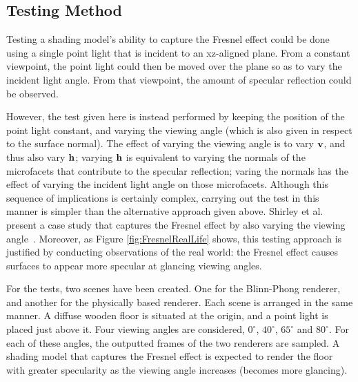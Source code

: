 \subsection{Testing Method}

Testing a shading model's ability to capture the Fresnel effect could be done using a single point light that is incident to an xz-aligned plane. From a constant viewpoint, the point light could then be moved over the plane so as to vary the incident light angle. From that viewpoint, the amount of specular reflection could be observed. 

However, the test given here is instead performed by keeping the position of the point light constant, and varying the viewing angle (which is also given in respect to the surface normal). The effect of varying the viewing angle is to vary \begin{math}\mathbf{v}\end{math}, and thus also vary \begin{math}\mathbf{h}\end{math}; varying \begin{math}\mathbf{h}\end{math} is equivalent to varying the normals of the microfacets that contribute to the specular reflection; varing the normals has the effect of varying the incident light angle on those microfacets. Although this sequence of implications is certainly complex, carrying out the test in this manner is simpler than the alternative approach given above. Shirley et al. present a case study that captures the Fresnel effect by also varying the viewing angle~\cite{PractitionersReflectionModels}. Moreover, as Figure \ref{fig:FresnelRealLife} shows, this testing approach is justified by conducting observations of the real world: the Fresnel effect causes surfaces to appear more specular at glancing viewing angles.

For the tests, two scenes have been created. One for the Blinn-Phong renderer, and another for the physically based renderer. Each scene is arranged in the same manner. A diffuse wooden floor is situated at the origin, and a point light is placed just above it. Four viewing angles are considered, \begin{math}0^{\circ}\end{math}, \begin{math}40^{\circ}\end{math}, \begin{math}65^{\circ}\end{math} and \begin{math}80^{\circ}\end{math}. For each of these angles, the outputted frames of the two renderers are sampled. A shading model that captures the Fresnel effect is expected to render the floor with greater specularity as the viewing angle increases (becomes more glancing).

